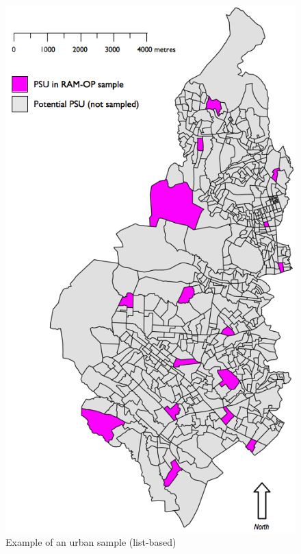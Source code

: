 \documentclass[12pt,a4paper]{book}
\theoremstyle{definition}
\theoremstyle{definition}
\theoremstyle{definition}
\theoremstyle{remark}
\begin{document}
\begin{figure}[H]

{\centering \includegraphics[width=6.97in]{figures/mapSample4} 

}

\caption{Example of an urban sample (list-based)}\label{fig:sample8}
\end{figure}
\end{document}

